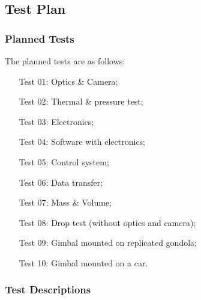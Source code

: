 
\pagebreak
\subsection{Test Plan}

\subsubsection{Planned Tests}
The planned tests are as follows:

\begin{enumerate}[leftmargin=2.1cm]
   \item[Test 01:] Optics \& Camera;
   \item[Test 02:] Thermal \& pressure test;
   \item[Test 03:] Electronics;
   \item[Test 04:] Software with electronics;
   \item[Test 05:] Control system;
   \item[Test 06:] Data transfer;
   \item[Test 07:] Mass \& Volume;
   \item[Test 08:] Drop test (without optics and camera);
   \item[Test 09:] Gimbal mounted on replicated gondola;
   \item[Test 10:] Gimbal mounted on a car.
\end{enumerate}

\subsubsection{Test Descriptions}






















